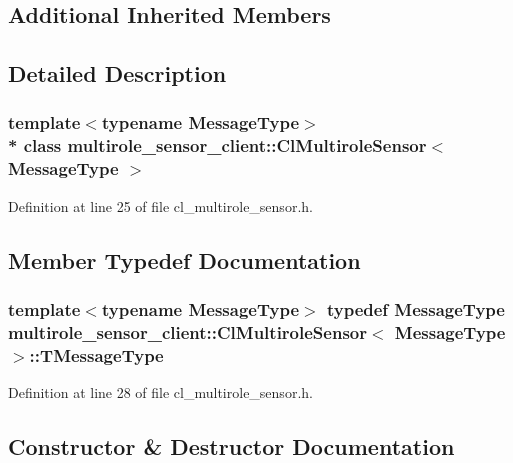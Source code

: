 \subsection*{Additional Inherited Members}


\subsection{Detailed Description}
\subsubsection*{template$<$typename Message\+Type$>$\\*
class multirole\+\_\+sensor\+\_\+client\+::\+Cl\+Multirole\+Sensor$<$ Message\+Type $>$}



Definition at line 25 of file cl\+\_\+multirole\+\_\+sensor.\+h.



\subsection{Member Typedef Documentation}
\subsubsection[{\texorpdfstring{T\+Message\+Type}{TMessageType}}]{\setlength{\rightskip}{0pt plus 5cm}template$<$typename Message\+Type$>$ typedef Message\+Type {\bf multirole\+\_\+sensor\+\_\+client\+::\+Cl\+Multirole\+Sensor}$<$ Message\+Type $>$\+::{\bf T\+Message\+Type}}\hypertarget{classmultirole__sensor__client_1_1ClMultiroleSensor_af6273a0b7c896dad766130706984071f}{}\label{classmultirole__sensor__client_1_1ClMultiroleSensor_af6273a0b7c896dad766130706984071f}


Definition at line 28 of file cl\+\_\+multirole\+\_\+sensor.\+h.



\subsection{Constructor \& Destructor Documentation}
